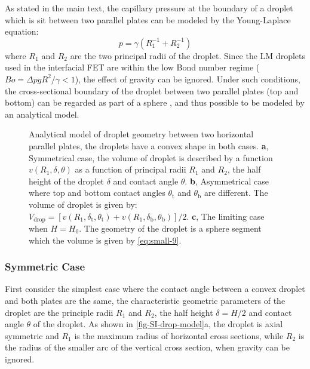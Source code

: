As stated in the main text, the capillary pressure at the boundary of a droplet which is sit
between two parallel plates can be modeled by the Young-Laplace
equation:
\begin{equation}
\label{eq:small-3}
p = \gamma (R_{1}^{-1} + R_{2}^{-1})
\end{equation}
where \(R_{1}\) and \(R_{2}\) are the two principal radii of the
droplet. Since the LM droplets used in the interfacial FET are
within the low Bond number regime (\(Bo = \Delta p g R^{2} / \gamma <
1\)), the effect of gravity can be ignored. Under such conditions,
the cross-sectional boundary of the droplet between two parallel
plates (top and bottom) can be regarded as part of a sphere
\autocite{berthier_2012_microdroplet}, and thus possible to be modeled by an
analytical model.

\begin{figure}[htbp]
\centering
{}
\caption{\label{fig-SI-drop-model}%
  Analytical model of droplet geometry between two horizontal parallel
  plates, the droplets have a convex shape in both cases. \textbf{a},
  Symmetrical case, the volume of droplet is described by a function
  \(v(R_{1}, \delta, \theta)\) as a function of principal radii
  \(R_{1}\) and \(R_{2}\), the half height of the droplet \(\delta\)
  and contact angle \(\theta\). \textbf{b}, Asymmetrical case where
  top and bottom contact angles \(\theta_{\mathrm{t}}\) and
  \(\theta_{\mathrm{b}}\) are different. The volume of droplet is
  given by:
  \(V_{\mathrm{drop}} = [v(R_{1}, \delta_{\mathrm{t}},
  \theta_{\mathrm{t}}) + v(R_{1}, \delta_{\mathrm{b}},
  \theta_{\mathrm{b}})]/2\). \textbf{c}, The limiting case when
  \(H=H_{0}\). The geometry of the droplet is a sphere segment which
  the volume is given by \autoref{eq:small-9}.  }
\end{figure}

\subsubsection*{Symmetric Case}
\label{sec:small-org5934fd4}

First consider the simplest case where the contact angle
between a convex droplet and both plates are the same, the
characteristic geometric parameters of the droplet are the principle
radii \(R_{1}\) and \(R_{2}\), the half height \(\delta=H/2\) and contact
angle \(\theta\) of the droplet. As
shown in \autoref{fig-SI-drop-model}a, the droplet is axial
symmetric and \(R_{1}\) is the maximum radius of horizontal cross
sections, while \(R_{2}\) is the radius of the smaller arc of the
vertical cross section, when gravity can be ignored.

